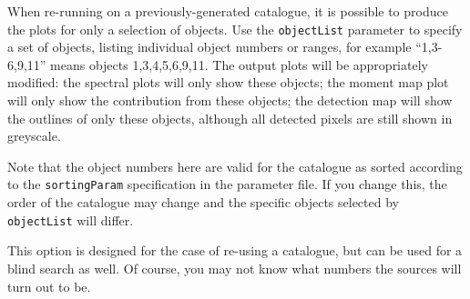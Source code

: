 
When re-running \duchamp on a previously-generated catalogue, it is
possible to produce the plots for only a selection of objects. Use the
\texttt{objectList} parameter to specify a set of objects, listing
individual object numbers or ranges, for example ``1,3-6,9,11'' means
objects 1,3,4,5,6,9,11. The output plots will be appropriately
modified: the spectral plots will only show these objects; the moment
map plot will only show the contribution from these objects; the
detection map will show the outlines of only these objects, although
all detected pixels are still shown in greyscale. 

Note that the object numbers here are valid for the catalogue as
sorted according to the \texttt{sortingParam} specification in the
parameter file. If you change this, the order of the catalogue may
change and the specific objects selected by \texttt{objectList} will
differ. 

This option is designed for the case of re-using a catalogue, but can
be used for a blind search as well. Of course, you may not know what
numbers the sources will turn out to be.

